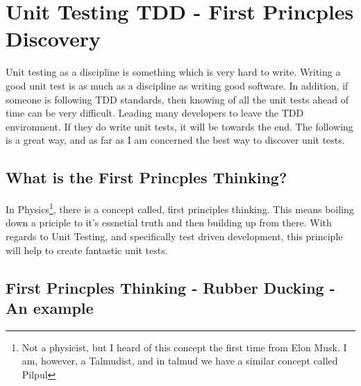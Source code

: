 
\chapter{ Unit Testing TDD - First Princples Discovery }

Unit testing as a discipline is something which is very hard to write. Writing
a good unit test is as much as a discipline as writing good software. In
addition, if someone is following TDD standards, then knowing of all the unit
tests ahead of time can be very difficult. Leading many developers to leave the
TDD environment. If they do write unit tests, it will be towards the end. The
following is a great way, and as far as I am concerned the best way to discover
unit tests.

\section{ What is the First Princples Thinking? }
In Physics\footnote{Not a physicist, but I heard of this concept the first time
from Elon Musk. I am, however, a Talmudist, and in talmud we have a similar
concept called Pilpul}, there is a concept called, first principles thinking.
This means boiling down a priciple to it's essnetial truth and then building up
from there. With regards to Unit Testing, and specifically test driven
development, this principle will help to create fantastic unit tests.

\section{ First Princples Thinking - Rubber Ducking - An example }

